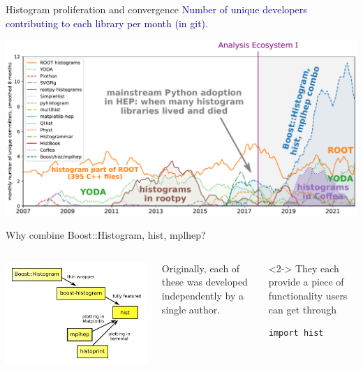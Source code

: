 \documentclass[aspectratio=169]{beamer}
\begin{document}
\begin{frame}{Histogram proliferation and convergence}
\vspace{0.25 cm}
\textcolor{darkblue}{Number of unique developers contributing to each library per month (in git).}

\includegraphics[width=\linewidth]{PLOTS/github-histogram-libraries.pdf}
\end{frame}

\begin{frame}[fragile]{Why combine Boost::Histogram, hist, mplhep?}
\vspace{0.5 cm}
\begin{columns}
\includegraphics[width=\linewidth]{PLOTS/histogram-convergence.pdf}

Originally, each of these was developed independently by a single author.

\vspace{0.75 cm}
\begin{uncoverenv}<2->
They each provide a piece of functionality users can get through

\begin{verbatim}
import hist
\end{verbatim}
\end{uncoverenv}

\vspace{0.75 cm}
\end{columns}
\end{frame}
\end{document}
